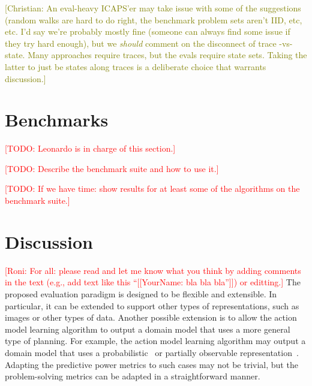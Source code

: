 \documentclass{article}
\theoremstyle{definition}
\theoremstyle{remark}
\newcommand{\todo}[1]{{\textcolor{red}{[TODO: #1]}}}
\newcommand{\roni}[1]{{\textcolor{red}{[Roni: #1]}}}
\newcommand{\cm}[1]{{\textcolor{olive}{[Christian: #1]}}}
\begin{document}
\cm{An eval-heavy ICAPS'er may take issue with some of the suggestions (random walks are hard to do right, the benchmark problem sets aren't IID, etc, etc. I'd say we're probably mostly fine (someone can always find some issue if they try hard enough), but we \textit{should} comment on the disconnect of trace -vs- state. Many approaches require traces, but the evals require state sets. Taking the latter to just be states along traces is a deliberate choice that warrants discussion.}



\section{Benchmarks}

\todo{Leonardo is in charge of this section.}

\todo{Describe the benchmark suite and how to use it.}

\todo{If we have time: show results for at least some of the algorithms on the benchmark suite.}

\section{Discussion}
\roni{For all: please read and let me know what you think by adding comments in the text (e.g., add text like this ``[[YourName: bla bla bla'']]) or editting.}
The proposed evaluation paradigm is designed to be flexible and extensible. 
In particular, it can be extended to support other types of representations, such as images or other types of data. 
Another possible extension is to allow the action model learning algorithm to output a domain model that uses a more general type of planning. 
For example, the action model learning algorithm may output a domain model that uses a probabilistic~\citep{xi2024neuro} or partially observable representation~\citep{le2024learning}. 
Adapting the predictive power metrics to such cases may not be trivial, but the problem-solving metrics can be adapted in a straightforward manner.
\end{document}
